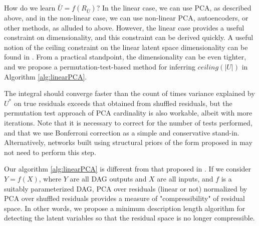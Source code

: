 \documentclass[letterpaper]{article}
\begin{document}
How do we learn $\bar{U} = f(R_{\bar{U}})$?  In the linear case, we can use PCA, as described above, and in the non-linear case, we can use non-linear PCA, autoencoders, or other methods, as alluded to above.  However, the linear case provides a useful constraint on dimensionality, and this constraint can be derived quickly.  A useful notion of the ceiling constraint on the linear latent space dimensionality can be found in \cite{gavish_optimal_2014}.  From a practical standpoint, the dimensionality can be even tighter, and we propose a permutation-test-based method for inferring $ceiling(|U|)$ in Algorithm \ref{alg:linearPCA}.

The integral should converge faster than the count of times variance explained by $U^{*}$ on true residuals exceeds that obtained from shuffled residuals, but the permutation test approach of PCA cardinality is also workable, albeit with more iterations.  Note that it is necessary to correct for the number of tests performed, and that we use Bonferroni correction as a simple and conservative stand-in. Alternatively, networks built using structural priors of the form proposed in \cite{friedman_being_2013} may not need to perform this step.

Our algorithm \ref{alg:linearPCA} is different from that proposed in \cite{elidan_learning_2005}.  If we consider $Y = f(X)$, where $Y$ are all DAG outputs and $X$ are all inputs, and $f$ is a suitably parameterized DAG, PCA over residuals (linear or not) normalized by PCA over shuffled residuals provides a measure of "compressibility" of residual space.  In other words, we propose a minimum description length algorithm for detecting the latent variables so that the residual space is no longer compressible.
\end{document}
